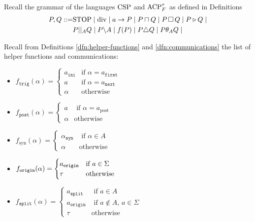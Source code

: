 \documentclass[../hons_project.tex]{subfiles}
\begin{document}
Recall the grammar of the languages $\mathrm{CSP}$ and $\mathrm{ACP}_{F}^{\tau}$ as defined in Definitions
\begin{align*}
	P, Q ::= & \mathrm{STOP} \mid \mathrm{div} \mid a\to P \mid P \sqcap Q \mid P \,\square\, Q \mid P \triangleright Q \mid \\
			 &P | |_{A} Q \mid P \backslash A \mid f(P) \mid P \triangle Q \mid P \theta_{A} Q \mid
\end{align*}

\vspace{-10pt}
Recall from Definitions \ref{dfn:helper-functions} and \ref{dfn:communications} the list of helper functions and communications:

\begin{multicols}{2}
	\begin{itemize}[leftmargin=*]
		\item $f_{\mathtt{trig}}(\alpha) = \begin{cases}
			a_{\mathtt{ini}} & \text{if } \alpha = a_{\mathtt{first}} \\
			a                & \text{if } \alpha = a_{\mathtt{next}}  \\
			\alpha           & \text{otherwise}
		\end{cases}$
		
		\item $f_{\mathtt{post}}(\alpha) = \begin{cases}
			a      & \text{ if } \alpha = a_{\mathrm{post}} \\
			\alpha & \text{otherwise}
		\end{cases}$
		
		\item $f_{\mathrm{syn}}(\alpha) = \begin{cases}
				      \alpha_{\mathtt{syn}} & \text{ if } \alpha\in A \\
				      \alpha                & \text{otherwise}
			      \end{cases}$
				  
		\item $f_{\mathtt{origin}}(\alpha) = \begin{cases}
				      a_{\mathtt{origin}} & \text{if } a\in\Sigma \\
				      \tau                & \text{otherwise}
			      \end{cases}$
		\item $f_{\mathtt{split}}(\alpha) = \begin{cases}
				      a_{\mathtt{split}}  & \text{ if } a\in A                    \\
				      a_{\mathtt{origin}} & \text{ if } a\not\in A,\, a\in \Sigma \\
				      \tau                & \mathrm{otherwise}
			      \end{cases}$
	\end{itemize}
\end{multicols}
\end{document}
